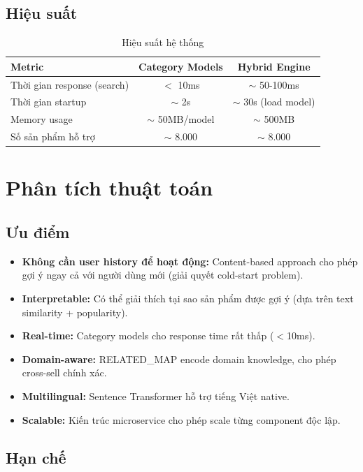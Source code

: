 \documentclass[12pt,a4paper]{report}
\begin{document}
\subsection{Hiệu suất}

\begin{table}[H]
\centering
\caption{Hiệu suất hệ thống}
\label{tab:performance}
\begin{tabular}{lcc}
\toprule
\textbf{Metric} & \textbf{Category Models} & \textbf{Hybrid Engine} \\
\midrule
Thời gian response (search) & $<$ 10ms & $\sim$ 50-100ms \\
Thời gian startup & $\sim$ 2s & $\sim$ 30s (load model) \\
Memory usage & $\sim$ 50MB/model & $\sim$ 500MB \\
Số sản phẩm hỗ trợ & $\sim$ 8.000 & $\sim$ 8.000 \\
\bottomrule
\end{tabular}
\end{table}

\section{Phân tích thuật toán}

\subsection{Ưu điểm}

\begin{itemize}
    \item \textbf{Không cần user history để hoạt động:} Content-based approach cho phép gợi ý ngay cả với người dùng mới (giải quyết cold-start problem).
    \item \textbf{Interpretable:} Có thể giải thích tại sao sản phẩm được gợi ý (dựa trên text similarity + popularity).
    \item \textbf{Real-time:} Category models cho response time rất thấp ($<$10ms).
    \item \textbf{Domain-aware:} RELATED\_MAP encode domain knowledge, cho phép cross-sell chính xác.
    \item \textbf{Multilingual:} Sentence Transformer hỗ trợ tiếng Việt native.
    \item \textbf{Scalable:} Kiến trúc microservice cho phép scale từng component độc lập.
\end{itemize}

\subsection{Hạn chế}
\end{document}
